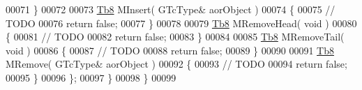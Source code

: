 \begin{DoxyCode}
00071          \}
00072 
00073          \mbox{\hyperlink{namespace_g_n_common_a8115dc7ed53b6e5b52e6bfde1632ea74}{Tb8}} MInsert( GTcType& aorObject )
00074          \{
00075             \textcolor{comment}{// TODO}
00076             \textcolor{keywordflow}{return} \textcolor{keyword}{false};
00077          \}
00078 
00079          \mbox{\hyperlink{namespace_g_n_common_a8115dc7ed53b6e5b52e6bfde1632ea74}{Tb8}} MRemoveHead( \textcolor{keywordtype}{void} )
00080          \{
00081             \textcolor{comment}{// TODO}
00082             \textcolor{keywordflow}{return} \textcolor{keyword}{false};
00083          \}
00084 
00085          \mbox{\hyperlink{namespace_g_n_common_a8115dc7ed53b6e5b52e6bfde1632ea74}{Tb8}} MRemoveTail( \textcolor{keywordtype}{void} )
00086          \{
00087             \textcolor{comment}{// TODO}
00088             \textcolor{keywordflow}{return} \textcolor{keyword}{false};
00089          \}
00090 
00091          \mbox{\hyperlink{namespace_g_n_common_a8115dc7ed53b6e5b52e6bfde1632ea74}{Tb8}} MRemove( GTcType& aorObject )
00092          \{
00093             \textcolor{comment}{// TODO}
00094             \textcolor{keywordflow}{return} \textcolor{keyword}{false};
00095          \}
00096       \};
00097    \}
00098 \}
00099 
\end{DoxyCode}
